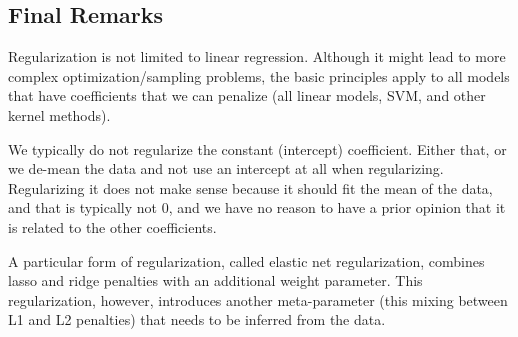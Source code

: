 \begin{refsection}
\subsection*{Final Remarks}

Regularization is not limited to linear regression. Although it might lead to more complex optimization/sampling problems, the basic principles apply to all models that have coefficients that we can penalize (all linear models, SVM, and other kernel methods).

We typically do not regularize the constant (intercept) coefficient. Either that, or we de-mean the data and not use an intercept at all when regularizing. Regularizing it does not make sense because it should fit the mean of the data, and that is typically not 0, and we have no reason to have a prior opinion that it is related to the other coefficients.

A particular form of regularization, called elastic net regularization, combines lasso and ridge penalties with an additional weight parameter. This regularization, however, introduces another meta-parameter (this mixing between L1 and L2 penalties) that needs to be inferred from the data.


\end{refsection}

